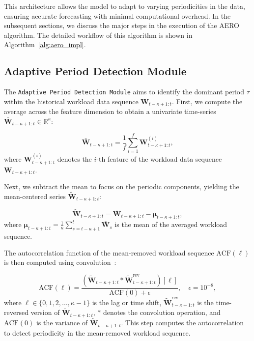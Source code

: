 This architecture allows the model to adapt to varying periodicities in the data, ensuring accurate forecasting with minimal computational overhead. In the subsequent sections, we discuss the major steps in the execution of the \ac{AERO} algorithm. The detailed workflow of this algorithm is shown in Algorithm~\ref{alg:aero_impl}.

\subsection{Adaptive Period Detection Module}
\label{sec:ch3_adaptive_period_detection}

The \texttt{Adaptive Period Detection Module} aims to identify the dominant period $\tau$ within the historical workload data sequence $\mathbf{W}_{t-\kappa+1:t}$. First, we compute the average across the feature dimension to obtain a univariate time-series $\bar{\mathbf{W}}_{t-\kappa+1:t} \in \mathbb{R}^\kappa$:

\begin{equation}
\label{eq:feature_avg}
\bar{\mathbf{W}}_{t-\kappa+1:t} = \frac{1}{f} \sum_{i=1}^{f} \mathbf{W}_{t-\kappa+1:t}^{(i)},
\end{equation}
where $\mathbf{W}_{t-\kappa+1:t}^{(i)}$ denotes the $i$-th feature of the workload data sequence $\mathbf{W}_{t-\kappa+1:t}$.

Next, we subtract the mean to focus on the periodic components, yielding the mean-centered series $\tilde{\mathbf{W}}_{t-\kappa+1:t}$:

\begin{equation}
\label{eq:mean_removal}
\tilde{\mathbf{W}}_{t-\kappa+1:t} = \bar{\mathbf{W}}_{t-\kappa+1:t} - \boldsymbol{\mu}_{t-\kappa+1:t},
\end{equation}
where $\boldsymbol{\mu}_{t-\kappa+1:t} = \frac{1}{\kappa} \sum_{s=t-\kappa+1}^{t} \bar{\mathbf{W}}_s$ is the mean of the averaged workload sequence.

The autocorrelation function of the mean-removed workload sequence $\text{ACF}(\ell)$ is then computed using convolution~\cite{zhang2020autocorrelation}:

\begin{equation}
\label{eq:acf}
\text{ACF}(\ell) = \frac{(\tilde{\mathbf{W}}_{t-\kappa+1:t} \ast \tilde{\mathbf{W}}^{\text{rev}}_{t-\kappa+1:t})[\ell]}{\text{ACF}(0) + \epsilon}, \quad \epsilon = 10^{-8},
\end{equation}
where $\ell \in \{0, 1, 2, \ldots, \kappa-1\}$ is the lag or time shift, $\tilde{\mathbf{W}}^{\text{rev}}_{t-\kappa+1:t}$ is the time-reversed version of $\tilde{\mathbf{W}}_{t-\kappa+1:t}$, $\ast$ denotes the convolution operation, and $\text{ACF}(0)$ is the variance of $\tilde{\mathbf{W}}_{t-\kappa+1:t}$. This step computes the autocorrelation to detect periodicity in the mean-removed workload sequence.

